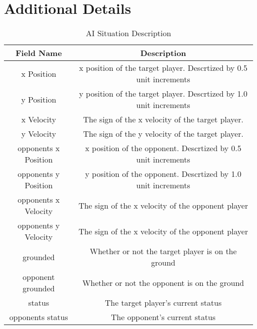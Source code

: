 
\chapter{Additional Details}

\begin{table}[h]
	\centering
	\caption{AI Situation Description}
	\begin{tabular}{| c | c |}
		\hline
		Field Name & Description \\
		\hline
		x Position        & x position of the target player. Descrtized by 0.5 unit increments	\\
		\hline
		y Position        & y position of the target player. Descrtized by 1.0 unit increments 	\\
		\hline
		x Velocity        & The sign of the x velocity of the target player.	\\
		\hline
		y Velocity        & The sign of the y velocity of the target player.	\\
		\hline
		opponents x Position        & x position of the opponent. Descrtized by 0.5 unit increments 	\\
		\hline
		opponents y Position        & y position of the opponent. Descrtized by 1.0 unit increments  	\\
		\hline
		opponents x Velocity        & The sign of the x velocity of the opponent player 	\\
		\hline
		opponents y Velocity        & The sign of the x velocity of the opponent player	\\
		\hline
		grounded        & Whether or not the target player is on the ground 	\\
		\hline
		opponent grounded       & Whether or not the opponent is on the ground  	\\
		\hline
		status        & The target player's current status 	\\
		\hline
		opponents status        & The opponent's current status 	\\
		\hline
	\end{tabular}
	\label{gamestate}
\end{table}

